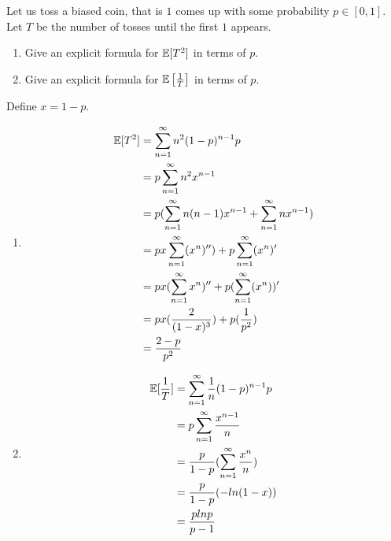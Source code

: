 \documentclass[12pt,a4]{article}
\begin{document}
\begin{exercise}
   Let us toss a biased coin, that is $1$ comes up with some probability $p \in [0,1]$. Let $T$ be the number
   of tosses until the first $1$ appears.
   \begin{enumerate}
        \item Give an explicit formula for $\mathbb{E}[T^2]$ in terms of $p$.
        \item Give an explicit formula for $\mathbb{E}\left[\frac{1}{T}\right]$ in terms of $p$.
   \end{enumerate}  
\end{exercise}

\begin{solution}
Define $x=1-p$.
\begin{enumerate}
  \item
  \begin{equation}
    \begin{split}
      \mathbb{E}[T^2]&= \sum_{n=1}^\infty n^2(1-p)^{n-1}p\\
      &=p\sum_{n=1}^\infty n^2x^{n-1}\\
      &=p(\sum_{n=1}^\infty n(n-1)x^{n-1}+\sum_{n=1}^\infty nx^{n-1})\\
      &=px\sum_{n=1}^\infty (x^n)'')+p\sum_{n=1}^\infty (x^n)'\\
      &=px(\sum_{n=1}^\infty x^n)''+p(\sum_{n=1}^\infty (x^n))'\\
      &=px(\frac{2}{(1-x)^3})+p(\frac{1}{p^2})\\
      &=\frac{2-p}{p^2}
    \end{split}
  \end{equation}

  \item

  \begin{equation}
    \begin{split}
      \mathbb{E}[\frac{1}{T}]&= \sum_{n=1}^\infty \frac{1}{n}(1-p)^{n-1}p\\
      &=p\sum_{n=1}^\infty \frac{x^{n-1}}{n}\\
      &=\frac{p}{1-p}(\sum_{n=1}^\infty \frac{x^n}{n})\\
      &=\frac{p}{1-p}(-ln(1-x))\\
      &=\frac{plnp}{p-1}
    \end{split}
  \end{equation}
\end{enumerate}
\end{solution}
\end{document}
